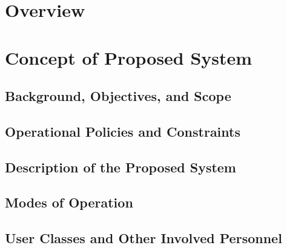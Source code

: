 \documentclass[12pt, letterpaper]{article}
\begin{document}
\cfoot{\normalsize\thepage}
\onehalfspacing

\newpage
\printglossary[type=\acronymtype, title= List of Nomenclature]
\printglossary[title=List of Symbols]
\newpage

\newpage
\tableofcontents
\newpage
\listoffigures
\listoftables

\clearpage
\cfoot{\normalsize\thepage}
\section{Overview}
\label{sect:overview}


\newpage
\section{Concept of Proposed System}
\subsection{Background, Objectives, and Scope}

\subsection{Operational Policies and Constraints}
\label{sect:policies}

\subsection{Description of the Proposed System}
\label{sect:prop_sys}

\subsection{Modes of Operation}

\subsection{User Classes and Other Involved Personnel}
\newpage
\end{document}
